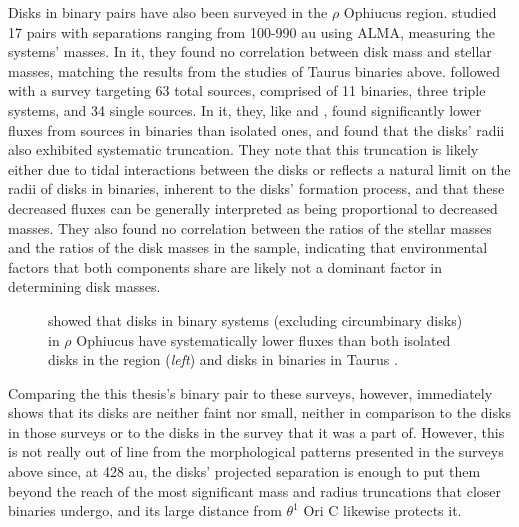 Disks in binary pairs have also been surveyed in the $\rho$ Ophiucus region. \citet{Akeson2014} studied 17 pairs with separations ranging from 100-990 au using ALMA, measuring the systems' masses. In it, they found no correlation between disk mass and stellar masses, matching the results from the studies of Taurus binaries above. \citet{Cox2017} followed with a survey targeting 63 total sources, comprised of 11 binaries, three triple systems, and 34 single sources. In it, they, like \citet{Harris2012} and \citet{Akeson2019}, found significantly lower fluxes from sources in binaries than isolated ones, and found that the disks' radii also exhibited systematic truncation. They note that this truncation is likely either due to tidal interactions between the disks or reflects a natural limit on the radii of disks in binaries, inherent to the disks' formation process, and that these decreased fluxes can be generally interpreted as being proportional to decreased masses. They also found no correlation between the ratios of the stellar masses and the ratios of the disk masses in the sample, indicating that environmental factors that both components share are likely not a dominant factor in determining disk masses.


 \begin{figure}[h]
   \hspace*{\fill}%
   \hspace*{\fill}%
   \caption{\citet{Cox2017} showed that disks in binary systems (excluding circumbinary disks) in $\rho$ Ophiucus have systematically lower fluxes than both isolated disks in the region (\textit{left}) and disks in binaries in Taurus \citep[from][]{Rebull2012}.}
   \label{fig:rhoOph_binaries}
 \end{figure}


Comparing the this thesis's binary pair to these surveys, however, immediately shows that its disks are neither faint nor small, neither in comparison to the disks in those surveys or to the disks in the survey that it was a part of. However, this is not really out of line from the morphological patterns presented in the surveys above since, at 428 au, the disks' projected separation is enough to put them beyond the reach of the most significant mass and radius truncations that closer binaries undergo, and its large distance from $\theta^1$ Ori C likewise protects it.






